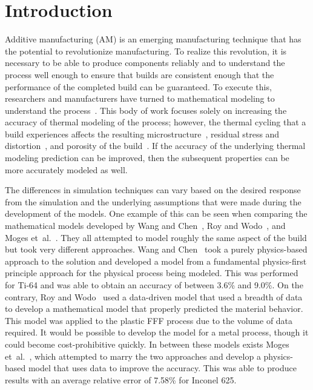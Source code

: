 \documentclass[metals,article,accept,pdftex,moreauthors]{Definitions/mdpi}
\begin{document}
\section{Introduction}
\label{introAMsim}

Additive manufacturing (AM) is an emerging manufacturing technique that has the 
potential to revolutionize manufacturing.  To realize this revolution, it is necessary to be 
able to produce components reliably and to understand the process well enough to ensure 
that builds are consistent enough that the performance of the completed build can be 
guaranteed.  To execute this, researchers and manufacturers have turned to mathematical 
modeling to understand the process~\cite{neittaanmakiImpactScientificComputing2023}.
This body of work focuses solely on increasing the accuracy of thermal modeling of the 
process; however, the thermal cycling that a build experiences affects the resulting 
microstructure~\cite{qianSubrapidSolidificationStudy2020, 
weiMechanisticModelsAdditive2020, ansariSelectiveLaserMelting2022}, residual stress and 
distortion~\cite{weiMechanisticModelsAdditive2020, ningAnalyticalModelingPart2020, 
promoppatumPartScaleEstimation2021}, and porosity of the 
build~\cite{ningAnalyticalModelingPart2020a, wangPredictionLackoffusionPorosity2021, 
linProcessOptimizationDirected2020}.  If the accuracy of the underlying thermal modeling 
prediction can be improved, then the subsequent properties can be more accurately 
modeled as well.

The differences in simulation techniques can vary based on the desired response from the simulation and the underlying assumptions that were made during the development of the models.
One example of this can be seen when comparing the mathematical models developed by 
Wang and Chen~\cite{wangClosedLoopHighFidelitySimulation2021}, Roy and 
Wodo~\cite{royDatadrivenModelingThermal2020}, and Moges 
et~al.~\cite{mogesHYBRIDMODELINGAPPROACH2020}.  They all attempted to model 
roughly the same aspect of the build but took very different approaches.
Wang and Chen~\cite{wangClosedLoopHighFidelitySimulation2021} took a purely 
physics-based approach to the solution and developed a model from a fundamental 
physics-first principle approach for the physical process being modeled. This was 
performed for Ti-64 and was able to obtain an accuracy of between 3.6\% and 9.0\%.
On the contrary, Roy and Wodo~\cite{royDatadrivenModelingThermal2020} used a 
data-driven model that used a breadth of data to develop a mathematical model that 
properly predicted the material behavior. This model was applied to the plastic \ac{FFF} 
process due to the volume of data required.  It would be possible to develop the model for 
a metal process, though it could become cost-prohibitive quickly.
In between these models exists Moges 
et~al.~\cite{mogesHYBRIDMODELINGAPPROACH2020}, which attempted to marry the 
two approaches and develop a physics-based model that uses data to improve the 
accuracy. This was able to produce results with an average relative error of 7.58\% for 
Inconel 625.
\end{document}
